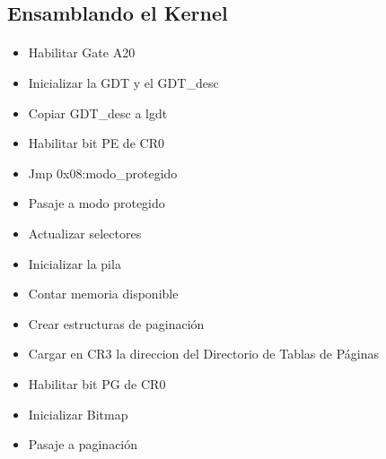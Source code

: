 \documentclass[11pt, a4paper]{article}
\begin{document}
\subsection{Ensamblando el Kernel}
\label{kernel}	
	\paragraph{}
	\begin{itemize}
		\item Habilitar Gate A20
		\item Inicializar la GDT y el GDT\_desc
		\item Copiar GDT\_desc a lgdt
		\item Habilitar bit PE de CR0
		\item Jmp 0x08:modo\_protegido
		\item Pasaje a modo protegido
		\item Actualizar selectores
		\item Inicializar la pila
		\item Contar memoria disponible
		\item Crear estructuras de paginación
		\item Cargar en CR3 la direccion del Directorio de Tablas de Páginas
		\item Habilitar bit PG de CR0
		\item Inicializar Bitmap
		\item Pasaje a paginación
	\end{itemize}
\end{document}
